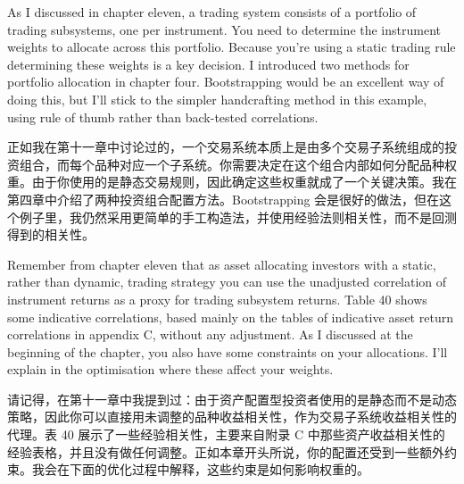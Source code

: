 
\begin{englishblock} As I discussed in chapter eleven, a trading system consists of a portfolio of trading subsystems, one per instrument. You need to determine the instrument weights to allocate across this portfolio. Because you're using a static trading rule determining these weights is a key decision. I introduced two methods for portfolio allocation in chapter four. Bootstrapping would be an excellent way of doing this, but I'll stick to the simpler handcrafting method in this example, using rule of thumb rather than back-tested correlations. \end{englishblock}

\begin{chineseblock}正如我在第十一章中讨论过的，一个交易系统本质上是由多个交易子系统组成的投资组合，而每个品种对应一个子系统。你需要决定在这个组合内部如何分配品种权重。由于你使用的是静态交易规则，因此确定这些权重就成了一个关键决策。我在第四章中介绍了两种投资组合配置方法。Bootstrapping 会是很好的做法，但在这个例子里，我仍然采用更简单的手工构造法，并使用经验法则相关性，而不是回测得到的相关性。\end{chineseblock}

\bipairgap

\begin{englishblock} Remember from chapter eleven that as asset allocating investors with a static, rather than dynamic, trading strategy you can use the unadjusted correlation of instrument returns as a proxy for trading subsystem returns. Table 40 shows some indicative correlations, based mainly on the tables of indicative asset return correlations in appendix C, without any adjustment. As I discussed at the beginning of the chapter, you also have some constraints on your allocations. I'll explain in the optimisation where these affect your weights. \end{englishblock}

\begin{chineseblock}请记得，在第十一章中我提到过：由于资产配置型投资者使用的是静态而不是动态策略，因此你可以直接用未调整的品种收益相关性，作为交易子系统收益相关性的代理。表 40 展示了一些经验相关性，主要来自附录 C 中那些资产收益相关性的经验表格，并且没有做任何调整。正如本章开头所说，你的配置还受到一些额外约束。我会在下面的优化过程中解释，这些约束是如何影响权重的。\end{chineseblock}

